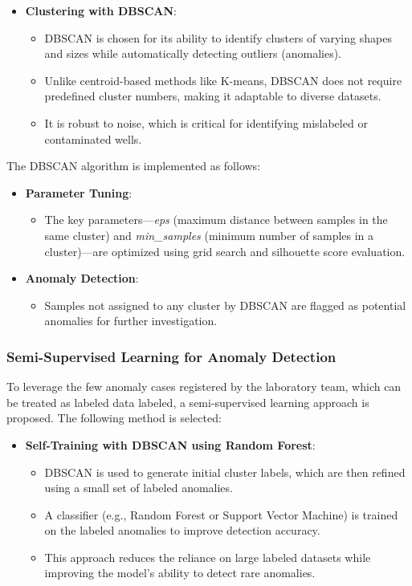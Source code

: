 \begin{itemize}
    \item \textbf{Clustering with DBSCAN}:
    \begin{itemize}
        \item DBSCAN is chosen for its ability to identify clusters of varying shapes and sizes while automatically detecting outliers (anomalies).
        \item Unlike centroid-based methods like K-means, DBSCAN does not require predefined cluster numbers, making it adaptable to diverse datasets.
        \item It is robust to noise, which is critical for identifying mislabeled or contaminated wells.
    \end{itemize}
\end{itemize}

The DBSCAN algorithm is implemented as follows:

\begin{itemize}
    \item \textbf{Parameter Tuning}:
    \begin{itemize}
        \item The key parameters—\textit{eps} (maximum distance between samples in the same cluster) and \textit{min\_samples} (minimum number of samples in a cluster)—are optimized using grid search and silhouette score evaluation.
    \end{itemize}

    \item \textbf{Anomaly Detection}:
    \begin{itemize}
        \item Samples not assigned to any cluster by DBSCAN are flagged as potential anomalies for further investigation.
    \end{itemize}
\end{itemize}

\subsubsection{Semi-Supervised Learning for Anomaly Detection}
To leverage the few anomaly cases registered by the laboratory team, which can be treated as labeled data labeled, a semi-supervised learning approach is proposed. The following method is selected:

\begin{itemize}
    \item \textbf{Self-Training with DBSCAN using Random Forest}:
    \begin{itemize}
        \item DBSCAN is used to generate initial cluster labels, which are then refined using a small set of labeled anomalies.
        \item A classifier (e.g., Random Forest or Support Vector Machine) is trained on the labeled anomalies to improve detection accuracy.
        \item This approach reduces the reliance on large labeled datasets while improving the model's ability to detect rare anomalies.
    \end{itemize}
\end{itemize}

